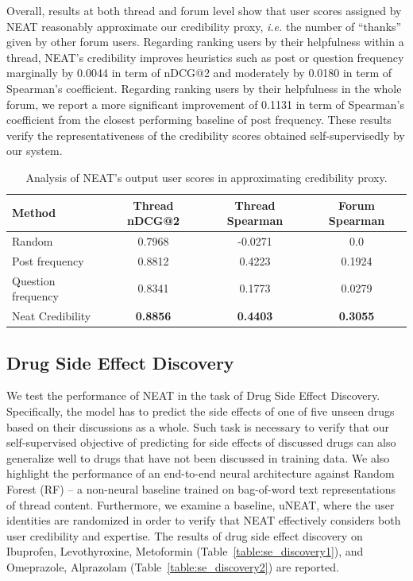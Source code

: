 \documentclass{bmcart}
\begin{document}
Overall, results at both thread and forum level show that user scores assigned by NEAT reasonably approximate our credibility proxy, \textit{i.e.} the number of ``thanks'' given by other forum users. Regarding ranking users by their helpfulness within a thread, NEAT's credibility improves heuristics such as post or question frequency marginally by 0.0044 in term of nDCG@2 and moderately by 0.0180 in term of Spearman's coefficient. Regarding ranking users by their helpfulness in the whole forum, we report a more significant improvement of 0.1131 in term of Spearman's coefficient from the closest performing baseline of post frequency. These results verify the representativeness of the credibility scores obtained self-supervisedly by our system.  

\begin{table}[t!]
  \captionsetup{justification=centering}
  \centering
  \scalebox{2}
  \footnotesize
  \begin{tabular}{l||c||c||c}
    \hline
    \textbf{Method}& Thread nDCG@2 & Thread Spearman & Forum Spearman \\\hline \hline
    Random  & 0.7968 & -0.0271 & 0.0 \\ \hline
    Post frequency & 0.8812 & 0.4223 & 0.1924 \\ \hline
    Question frequency & 0.8341 & 0.1773 & 0.0279 \\ \hline
    Neat Credibility & \textbf{0.8856} & \textbf{0.4403} & \textbf{0.3055} \\ \hline\hline
  \end{tabular}
  \caption{Analysis of NEAT's output user scores in approximating credibility proxy.}\label{table:credibility}
\end{table}

\subsection{Drug Side Effect Discovery}
We test the performance of NEAT in the task of Drug Side Effect Discovery. Specifically, the model has to predict the side effects of one of five unseen drugs based on their discussions as a whole. Such task is necessary to verify that our self-supervised objective of predicting for side effects of discussed drugs can also generalize well to
drugs that have not been discussed in training data. We also highlight the performance of an end-to-end neural architecture against Random Forest (RF) -- a non-neural baseline trained on bag-of-word text representations of thread content. Furthermore, we examine a baseline, uNEAT, where the user identities are randomized in order to verify that NEAT effectively considers both user credibility and expertise. The results of drug side effect discovery on Ibuprofen, Levothyroxine, Metoformin (Table~\ref{table:se_discovery1}), and Omeprazole, Alprazolam (Table~\ref{table:se_discovery2}) are reported. 
\end{document}
